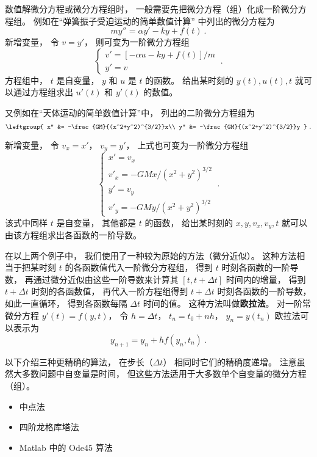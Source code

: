 

数值解微分方程或微分方程组时， 一般需要先把微分方程（组）化成一阶微分方程组。 例如在“弹簧振子受迫运动的简单数值计算” 中列出的微分方程为
\begin{equation}
m y'' = \alpha y' - ky + f(t)~.
\end{equation}
新增变量， 令 $v = y'$， 则可变为一阶微分方程组
\begin{equation}
\begin{cases}
v' = [-\alpha u - ky + f(t)]/m\\
y' = v
\end{cases}~.
\end{equation}
方程组中， $t$ 是自变量， $y$ 和 $u$ 是 $t$ 的函数。 给出某时刻的 $y(t), u(t), t$ 就可以通过方程组求出 $u'(t)$ 和 $y'(t)$ 的数值。

又例如在“天体运动的简单数值计算”中， 列出的二阶微分方程组为
\begin{equation}
\leftgroup{
x'' &= -\frac{GM}{(x^2+y^2)^{3/2}}x\\
y'' &= -\frac{GM}{(x^2+y^2)^{3/2}}y
}~.\end{equation}

新增变量， 令 $v_x = x'$， $v_y = y'$， 上式也可变为一阶微分方程组
\begin{equation}\label{eq_OdeNum_4}
\begin{cases}
x' = v_x\\
v'_x = -GMx/(x^2 + y^2)^{3/2}\\
y' = v_y\\
v'_y = -GMy/(x^2 + y^2)^{3/2}
\end{cases}~.
\end{equation}
该式中同样 $t$ 是自变量， 其他都是 $t$ 的函数， 给出某时刻的 $x, y, v_x, v_y, t$ 就可以由该方程组求出各函数的一阶导数。

在以上两个例子中， 我们使用了一种较为原始的方法（微分近似）。 这种方法相当于把某时刻 $t$ 的各函数值代入一阶微分方程组， 得到 $t$ 时刻各函数的一阶导数， 再通过微分近似由这些一阶导数来计算其 $[t, t + \Delta t]$ 时间内的增量， 得到 $t +\Delta t$ 时刻的各函数值， 再代入一阶方程组得到 $t +\Delta t$ 时刻各函数的一阶导数， 如此一直循环， 得到各函数每隔 $\Delta t$ 时间的值。 这种方法叫做\textbf{欧拉法}。 对一阶常微分方程 $y'(t) = f(y, t)$， 令 $h = \Delta t$， $t_n = t_0 + nh$， $y_n = y(t_n)$ 欧拉法可以表示为
\begin{equation}\label{eq_OdeNum_5}
y_{n+1} = y_n + h f(y_n, t_n)~.
\end{equation}

以下介绍三种更精确的算法， 在步长（$\Delta t$） 相同时它们的精确度递增。 注意虽然大多数问题中自变量是时间， 但这些方法适用于大多数单个自变量的微分方程（组）。

\begin{itemize}
\item 中点法
\item 四阶龙格库塔法
\item Matlab 中的 Ode45 算法
\end{itemize}













